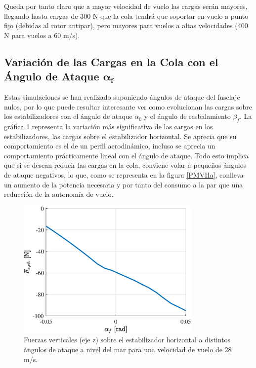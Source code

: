 Queda por tanto claro que a mayor velocidad de vuelo las cargas serán mayores, llegando hasta cargas de 300 N que la cola tendrá que soportar en vuelo a punto fijo (debidas al rotor antipar), pero mayores para vuelos a altas velocidades (400 N para vuelos a 60 m/s).

\subsection{Variación de las Cargas en la Cola con el Ángulo de Ataque $\boldsymbol{\alpha_f}$}

Estas simulaciones se han realizado suponiendo ángulos de ataque del fuselaje nulos, por lo que puede resultar interesante ver como evolucionan las cargas sobre los estabilizadores con el ángulo de ataque $\alpha_0$ y el ángulo de resbalamiento $\beta_f$. La gráfica \ref{FEa} representa la variación más significativa de las cargas en los estabilizadores, las cargas sobre el estabilizador horizontal. Se aprecia que su comportamiento es el de un perfil aerodinámico, incluso se aprecia un comportamiento prácticamente lineal con el ángulo de ataque. Todo esto implica que si se desean reducir las cargas en la cola, conviene volar a pequeños ángulos de ataque negativos, lo que, como se representa en la figura \ref{PMVHa}, conlleva un aumento de la potencia necesaria y por tanto del consumo a la par que una reducción de la autonomía de vuelo.

\begin{figure}
	\centering
	\includegraphics[width=90mm]{graficos/FEHa}
	\caption{Fuerzas verticales (eje z) sobre el estabilizador horizontal a distintos ángulos de ataque a nivel del mar para una velocidad de vuelo de 28 m/s.}
	\label{FEa}
\end{figure}

